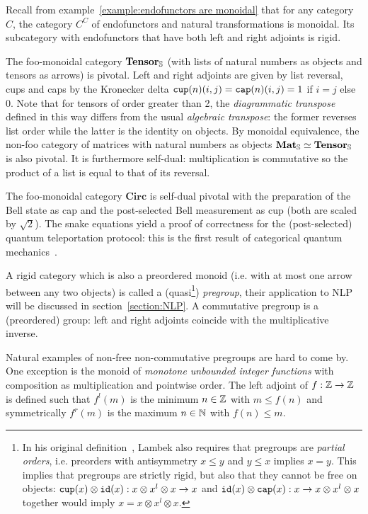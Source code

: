 \begin{example}
Recall from example~\ref{example:endofunctors are monoidal} that for any category $C$, the category $C^C$ of endofunctors and natural transformations is monoidal.
Its subcategory with endofunctors that have both left and right adjoints is rigid.
\end{example}

\begin{example}
The foo-monoidal category $\mathbf{Tensor}_\S$ (with lists of natural numbers as objects and tensors as arrows) is pivotal.
Left and right adjoints are given by list reversal, cups and caps by the Kronecker delta $\ttcup(n)(i, j) = \ttcap(n)(i, j) = 1$ if $i = j$ else $0$.
Note that for tensors of order greater than 2, the \emph{diagrammatic transpose} defined in this way differs from the usual \emph{algebraic transpose}: the former reverses list order while the latter is the identity on objects.
By monoidal equivalence, the non-foo category of matrices with natural numbers as objects $\mathbf{Mat}_\S \simeq \mathbf{Tensor}_\S$ is also pivotal.
It is furthermore self-dual: multiplication is commutative so the product of a list is equal to that of its reversal.
\end{example}

\begin{example}
The foo-monoidal category $\mathbf{Circ}$ is self-dual pivotal with the preparation of the Bell state as cap and the post-selected Bell measurement as cup (both are scaled by $\sqrt{2}$).
The snake equations yield a proof of correctness for the (post-selected) quantum teleportation protocol: this is the first result of categorical quantum mechanics~\cite{AbramskyCoecke08}.
\end{example}

\begin{example}
A rigid category which is also a preordered monoid (i.e. with at most one arrow between any two objects) is called a (quasi\footnote
{In his original definition~\cite{Lambek99}, Lambek also requires that pregroups are \emph{partial orders}, i.e. preorders with antisymmetry $x \leq y$ and $y \leq x$ implies $x = y$.
This implies that pregroups are strictly rigid, but also that they cannot be free on objects: $\ttcup(x) \otimes \id(x) : x \otimes x^l \otimes x \to x$ and $\id(x) \otimes \ttcap(x) : x \to x \otimes x^l \otimes x$ together would imply $x = x \otimes x^l \otimes x$.
}) \emph{pregroup}, their application to NLP will be discussed in section~\ref{section:NLP}.
A commutative pregroup is a (preordered) group: left and right adjoints coincide with the multiplicative inverse.

Natural examples of non-free non-commutative pregroups are hard to come by.
One exception is the monoid of \emph{monotone unbounded integer functions} with composition as multiplication and pointwise order.
The left adjoint of $f : \Z \to \Z$ is defined such that $f^l(m)$ is the minimum $n \in \Z$ with $m \leq f(n)$ and symmetrically $f^r(m)$ is the maximum $n \in \N$ with $f(n) \leq m$.
\end{example}

